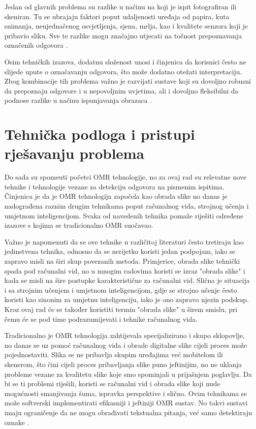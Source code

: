 \documentclass{foi}
\begin{document}
Jedan od glavnih problema su razlike u načinu na koji je ispit fotografiran ili skeniran. Tu se ubrajaju faktori poput udaljenosti uređaja od papira, kuta snimanja, neujednačenog osvjetljenja, sjena, mrlja, kao i kvalitete senzora koji je pribavio sliku. Sve te razlike mogu značajno utjecati na točnost prepoznavanja označenih odgovora \cite{OMRart}.

Osim tehničkih izazova, dodatnu složenost unosi i činjenica da korisnici često ne slijede upute o označavanju odgovora, što može dodatno otežati interpretaciju. Zbog kombinacije tih problema važno je razvijati sustave koji su dovoljno robusni da prepoznaju odgovore i u nepovoljnim uvjetima, ali i dovoljno fleksibilni da podnose razlike u načinu ispunjavanja obrazaca \cite{OMRart}.

\section{Tehnička podloga i pristupi rješavanju problema}

Do sada su spomeuti početci OMR tehnologije, no za ovaj rad su relevatne nove tehnike i tehnologije vezane za detekciju odgovora na pismenim ispitima. Činjenica je da je OMR tehnologija započela kao obrada slike no danas je nadograđena raznim drugim tehnikama poput računalnog vida, strojnog učenja i umjetnom inteligencijom. Svaka od navedenih tehnika pomaže riješiti određene izazove s kojima se tradicionalno OMR suočavao.

Važno je napomenuti da se ove tehnike u različitoj literaturi često tretiraju kao jedinstvena tehnika, odnosno da se nerijetko koristi jedan podpojam, iako se zapravo misli na širi skup povezanih metoda. Primjerice, obrada slike tehnički spada pod računalni vid, no u mnogim radovima koristi se izraz "obrada slike" i kada se misli na šire postupke karakteristične za računalni vid. Slična je situacija i sa strojnim učenjem i umjetnom inteligencijom, gdje se strojno učenje često koristi kao sinonim za umjetnu inteligenciju, iako je ono zapravo njezin podskup. Kroz ovaj rad će se također koristiti termin "obrada slike" u širem smislu, pri čemu će se pod time podrazumijevati i tehnike računalnog vida.

Tradicionalno je OMR tehnologija zahtijevala specijalizirano i skupo sklopovlje, no danas se uz pomoć računalnog vida i obrade digitalne slike cijeli proces može pojednostaviti. Slika se ne pribavlja skupim uređajima već mobitelom ili skenerom, što čini cijeli proces pribavljanja slike puno jeftinijim, no ne uklanja probleme vezane za kvalitetu slike koje smo spominjali u prijašnjem poglavlju. Da bi se ti problemi riješili, koristi se računalni vid i obrada slike koji nude mogućnosti smanjivanja šuma, ispravka perspektive i slično. Ovim tehnikama se može softverski implementirati efikasniji i jeftiniji OMR sustav. No takvi sustavi imaju ograničenje da ne mogu obrađivati tekstualna pitanja, već samo detektiraju oznake \cite{OMRImageProcessing}.
\end{document}
